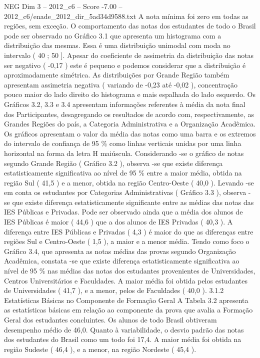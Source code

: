 \begin{textsample}{NEG Dim 3 – 2012\_c6 – Score -7.00 – 2012\_c6/enade\_2012\_dir\_5ad34d9588.txt}
A nota mínima foi zero em todas as regiões, sem exceção.
O comportamento das notas dos estudantes de todo o Brasil pode ser observado no Gráfico 3.1 que apresenta um histograma com a distribuição das mesmas.
Essa é uma distribuição unimodal com moda no intervalo ( 40 ; 50 ].
Apesar do coeficiente de assimetria da distribuição das notas ser negativo ( -0,17 ) este é pequeno e podemos considerar que a distribuição é aproximadamente simétrica.
As distribuições por Grande Região também apresentam assimetria negativa ( variando de -0,23 até -0,02 ), concentração pouco maior do lado direito do histograma e mais espalhada do lado esquerdo.
Os Gráficos 3.2, 3.3 e 3.4 apresentam informações referentes à média da nota final dos Participantes, desagregando os resultados de acordo com, respectivamente, as Grandes Regiões do país, a Categoria Administrativa e a Organização Acadêmica.
Os gráficos apresentam o valor da média das notas como uma barra e os extremos do intervalo de confiança de 95 \% como linhas verticais unidas por uma linha horizontal na forma da letra H maiúscula.
Considerando -se o gráfico de notas segundo Grande Região ( Gráfico 3.2 ), observa -se que existe diferença estatisticamente significativa ao nível de 95 \% entre a maior média, obtida na região Sul ( 41,5 ) e a menor, obtida na região Centro-Oeste ( 40,0 ).
Levando -se em conta os estudantes por Categorias Administrativas ( Gráfico 3.3 ), observa -se que existe diferença estatisticamente significante entre as médias das notas das IES Públicas e Privadas.
Pode ser observado ainda que a média dos alunos de IES Públicas é maior ( 44,6 ) que a dos alunos de IES Privadas ( 40,3 ).
A diferença entre IES Públicas e Privadas ( 4,3 ) é maior do que as diferenças entre regiões Sul e Centro-Oeste ( 1,5 ), a maior e a menor média.
Tendo como foco o Gráfico 3.4, que apresenta as notas médias das provas segundo Organização Acadêmica, constata -se que existe diferença estatisticamente significativa ao nível de 95 \% nas médias das notas dos estudantes provenientes de Universidades, Centros Universitários e Faculdades.
A maior média foi obtida pelos estudantes de Universidades ( 41,7 ), e a menor, pelos de Faculdades ( 40,0 ). 3.1.2 Estatísticas Básicas no Componente de Formação Geral A Tabela 3.2 apresenta as estatísticas básicas em relação ao componente da prova que avalia a Formação Geral dos estudantes concluintes.
Os alunos de todo Brasil obtiveram desempenho médio de 46,0.
Quanto à variabilidade, o desvio padrão das notas dos estudantes do Brasil como um todo foi 17,4.
A maior média foi obtida na região Sudeste ( 46,4 ), e a menor, na região Nordeste ( 45,4 ).

\end{textsample}
